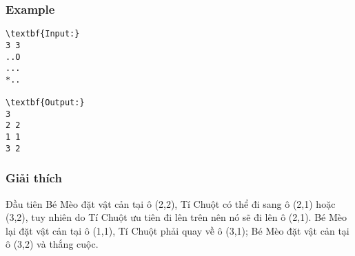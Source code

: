 \subsubsection{Example}
\begin{verbatim}
\textbf{Input:}
3 3
..O
...
*..

\textbf{Output:}
3
2 2
1 1
3 2\end{verbatim}

\subsubsection{Giải thích}

Đầu tiên Bé Mèo đặt vật cản tại ô (2,2), Tí Chuột có thể đi sang ô (2,1) hoặc (3,2), tuy nhiên do Tí Chuột ưu tiên đi lên trên nên nó sẽ đi lên ô (2,1). Bé Mèo lại đặt vật cản tại ô (1,1), Tí Chuột phải quay về ô (3,1); Bé Mèo đặt vật cản tại ô (3,2) và thắng cuộc.
